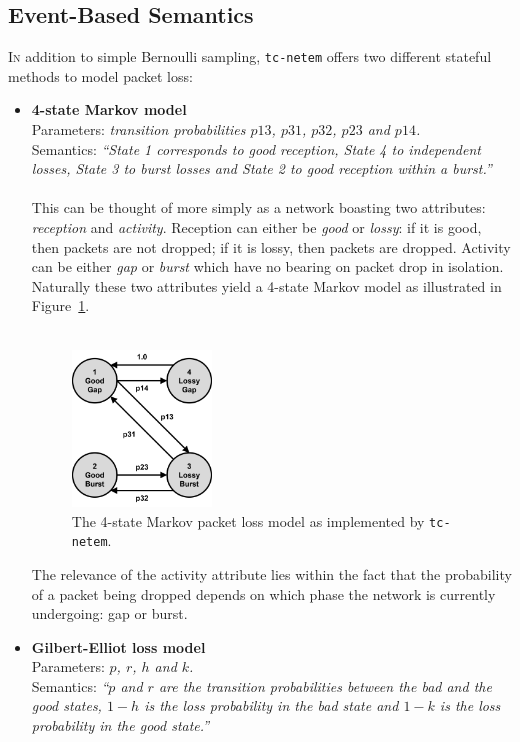 \newpage

\subsection{Event-Based Semantics}\label{subsection:event_based_semantics}

\lettrine{I}{n} addition to simple Bernoulli sampling, \texttt{tc-netem} offers two different stateful methods to
model packet
loss\cite{tc_netem_8_man}:
\begin{itemize}
    \item \textbf{4-state Markov model} \\
    Parameters: \emph{transition probabilities $p13$, $p31$, $p32$, $p23$ and $p14$.} \\
    Semantics: \emph{``State 1 corresponds to good reception, State 4 to independent losses, State 3 to burst losses
    and State 2 to good reception within a burst.''} \\ \\
    This can be thought of more simply as a network boasting two attributes: \emph{reception} and \emph{activity}.
    Reception can either be \emph{good} or \emph{lossy}: if it is good, then packets are not dropped; if it is lossy,
    then packets are dropped. Activity can be either \emph{gap} or \emph{burst} which have no bearing on packet drop
    in isolation. Naturally these two attributes yield a 4-state Markov model as illustrated in
    Figure~\ref{fig:chapter_3_design-tc_netem_4_state_markov_diagram}. \\ \\
    \begin{figure}[!h]
        \includegraphics[width=0.35\textwidth]{images/chapter_3_design/tc_netem_4_state_markov_diagram}
        \centering
        \caption{The 4-state Markov packet loss model as implemented by
        \texttt{tc-netem}\cite{tc_netem_src}.}\label{fig:chapter_3_design-tc_netem_4_state_markov_diagram}
    \end{figure}

    The relevance of the activity attribute lies within the fact that the probability of a packet being dropped
    depends on which phase the network is currently undergoing: gap or burst.
    \item \textbf{Gilbert-Elliot loss model} \\
    Parameters: \emph{$p$, $r$, $h$ and $k$.} \\
    Semantics: \emph{``$p$ and $r$ are the transition probabilities between the bad and the good states, $1-h$ is the
    loss probability in the bad state and $1-k$ is the loss probability in the good state.''}
\end{itemize}

